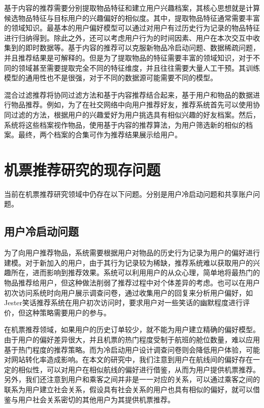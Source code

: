 基于内容的推荐需要分别提取物品特征和建立用户兴趣档案，其核心思想就是计算候选物品特征与目标用户的兴趣偏好的相似度。其中，提取物品特征通常需要丰富的领域知识。最基本的用户偏好模型可以通过对用户有过历史行为记录的物品特征进行归纳得到。除此之外，还可以考虑用户行为的时间因素、用户在本次交互中收集到的即时数据等。基于内容的推荐可以克服新物品冷启动问题、数据稀疏问题，并且推荐结果是可解释的。但是为了提取物品的特征需要丰富的领域知识，对于不同的领域甚至需要提取完全不同的特征维度，并且往往需要大量人工干预。其训练模型的通用性也不是很强，对于不同的数据源可能需要不同的模型。

混合过滤推荐将协同过滤方法和基于内容推荐结合起来，基于用户和物品的数据进行物品推荐。例如，为了在社交网络中向用户推荐好友\cite{portugal2015use}，推荐系统首先可以使用协同过滤的方法，根据用户的兴趣爱好为用户挑选具有相似兴趣的好友档案。然后，系统将这些档案视作物品，使用基于内容的推荐算法，为用户筛选新的相似的档案。最终，两个档案的合集可作为推荐结果展示给用户。

\section{机票推荐研究的现存问题}


当前在机票推荐研究领域中仍存在以下问题。分别是用户冷启动问题\cite{schein2002methods}和共享账户问题\cite{weston2013nonlinear}。

\subsection{用户冷启动问题}

为了向用户推荐物品，系统需要根据用户对物品的历史行为记录为用户的偏好进行建模。对于新加入的用户，由于其行为记录较为稀缺，推荐系统难以获取用户的兴趣所在，进而影响到推荐效果。系统可以利用用户的从众心理，简单地将最热门\cite{sun2012survey}的物品推荐给用户，但这种做法削弱了推荐过程中对个体差异的考虑。也可以在用户初次访问系统时向用户展示调查问卷，通过收集用户的回复来分析用户偏好，如Jester\cite{goldberg2001eigentaste}笑话推荐系统在用户初次访问时，要求用户对一些笑话的幽默程度进行评价，但这种策略需要用户的参与。

在机票推荐领域，如果用户的历史订单较少，就不能为用户建立精确的偏好模型。由于用户的偏好差异很大，并且机票的热门程度受制于航班的舱位数量，难以应用基于热门程度的推荐策略。而为冷启动用户设计调查问卷则会降低用户体验，可能对网站转化率造成影响。在本文的研究中，我们注意到用户在航线间的偏好存在一定的相似性，可以对用户在相似航线的偏好进行借鉴，从而为用户提供机票推荐。另外，我们还注意到用户和乘客之间并非是一一对应的关系，可以通过乘客之间的联系为用户建立社会关系\cite{sedhain2014social}，假设具有社会关系的用户也具有相似的偏好，就可以借鉴与用户社会关系密切的其他用户为其提供机票推荐。

